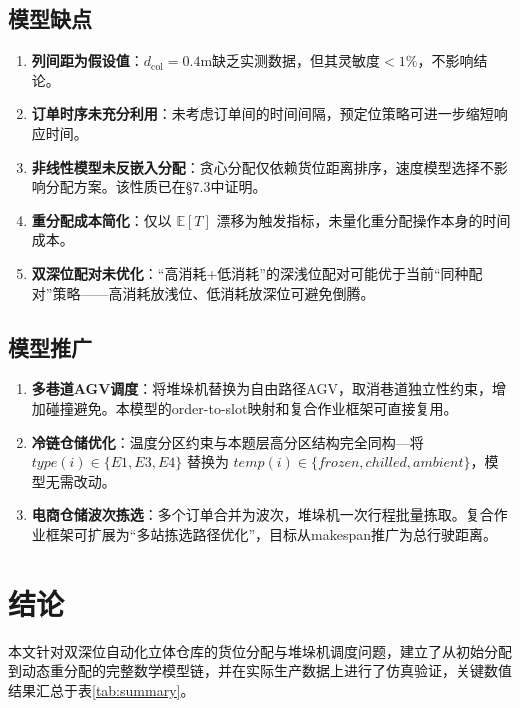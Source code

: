\documentclass[a4paper]{cumcmthesis}
\begin{document}
\subsection{模型缺点}
\begin{enumerate}
\item \textbf{列间距为假设值}：$d_{\text{col}}=0.4$m缺乏实测数据，但其灵敏度$<1\%$，不影响结论。
\item \textbf{订单时序未充分利用}：未考虑订单间的时间间隔，预定位策略可进一步缩短响应时间。
\item \textbf{非线性模型未反嵌入分配}：贪心分配仅依赖货位距离排序，速度模型选择不影响分配方案。该性质已在§7.3中证明。
\item \textbf{重分配成本简化}：仅以 $\mathbb{E}[T]$ 漂移为触发指标，未量化重分配操作本身的时间成本。
\item \textbf{双深位配对未优化}：``高消耗+低消耗''的深浅位配对可能优于当前``同种配对''策略——高消耗放浅位、低消耗放深位可避免倒腾。
\end{enumerate}

\subsection{模型推广}
\begin{enumerate}[(1)]
\item \textbf{多巷道AGV调度}：将堆垛机替换为自由路径AGV，取消巷道独立性约束，增加碰撞避免。本模型的order-to-slot映射和复合作业框架可直接复用。
\item \textbf{冷链仓储优化}：温度分区约束与本题层高分区结构完全同构---将 $type(i)\in\{E1,E3,E4\}$ 替换为 $temp(i)\in\{frozen,chilled,ambient\}$，模型无需改动。
\item \textbf{电商仓储波次拣选}：多个订单合并为波次，堆垛机一次行程批量拣取。复合作业框架可扩展为``多站拣选路径优化''，目标从makespan推广为总行驶距离。
\end{enumerate}

\section{结论}

本文针对双深位自动化立体仓库的货位分配与堆垛机调度问题，建立了从初始分配到动态重分配的完整数学模型链，并在实际生产数据上进行了仿真验证，关键数值结果汇总于表\ref{tab:summary}。
\end{document}
